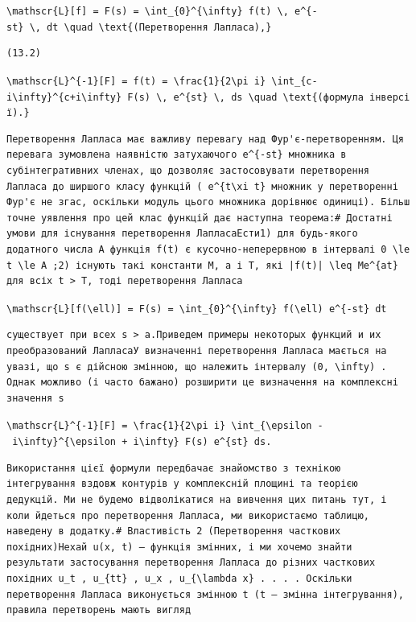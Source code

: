 \documentclass[
  ukrainian,
]{article}
\begin{document}
\texttt{\textbackslash{}mathscr\{L\}{[}f{]}\ =\ F(s)\ =\ \textbackslash{}int\_\{0\}\^{}\{\textbackslash{}infty\}\ f(t)\ \textbackslash{},\ e\^{}\{-st\}\ \textbackslash{},\ dt\ \textbackslash{}quad\ \textbackslash{}text\{(Перетворення\ Лапласа),\}}

\begin{verbatim}
(13.2)
\end{verbatim}

\texttt{\textbackslash{}mathscr\{L\}\^{}\{-1\}{[}F{]}\ =\ f(t)\ =\ \textbackslash{}frac\{1\}\{2\textbackslash{}pi\ i\}\ \textbackslash{}int\_\{c-i\textbackslash{}infty\}\^{}\{c+i\textbackslash{}infty\}\ F(s)\ \textbackslash{},\ e\^{}\{st\}\ \textbackslash{},\ ds\ \textbackslash{}quad\ \textbackslash{}text\{(формула\ інверсії).\}}

\begin{verbatim}
Перетворення Лапласа має важливу перевагу над Фур'є-перетворенням. Ця перевага зумовлена наявністю затухаючого e^{-st} множника в субінтегративних членах, що дозволяє застосовувати перетворення Лапласа до ширшого класу функцій ( e^{t\xi t} множник у перетворенні Фур'є не згас, оскільки модуль цього множника дорівнює одиниці). Більш точне уявлення про цей клас функцій дає наступна теорема:# Достатні умови для існування перетворення ЛапласаЕсти1) для будь-якого додатного числа A функція f(t) є кусочно-неперервною в інтервалі 0 \le t \le A ;2) існують такі константи M, a і T, які |f(t)| \leq Me^{at} для всіх t > T, тоді перетворення Лапласа
\end{verbatim}

\texttt{\textbackslash{}mathscr\{L\}{[}f(\textbackslash{}ell){]}\ =\ F(s)\ =\ \textbackslash{}int\_\{0\}\^{}\{\textbackslash{}infty\}\ f(\textbackslash{}ell)\ e\^{}\{-st\}\ dt}

\begin{verbatim}
существует при всех s > a.Приведем примеры некоторых функций и их преобразований ЛапласаУ визначенні перетворення Лапласа мається на увазі, що s є дійсною змінною, що належить інтервалу (0, \infty) . Однак можливо (і часто бажано) розширити це визначення на комплексні значення s
\end{verbatim}

\texttt{\textbackslash{}mathscr\{L\}\^{}\{-1\}{[}F{]}\ =\ \textbackslash{}frac\{1\}\{2\textbackslash{}pi\ i\}\ \textbackslash{}int\_\{\textbackslash{}epsilon\ -\ i\textbackslash{}infty\}\^{}\{\textbackslash{}epsilon\ +\ i\textbackslash{}infty\}\ F(s)\ e\^{}\{st\}\ ds.}

\begin{verbatim}
Використання цієї формули передбачає знайомство з технікою інтегрування вздовж контурів у комплексній площині та теорією дедукцій. Ми не будемо відволікатися на вивчення цих питань тут, і коли йдеться про перетворення Лапласа, ми використаємо таблицю, наведену в додатку.# Властивість 2 (Перетворення часткових похідних)Нехай u(x, t) — функція змінних, і ми хочемо знайти результати застосування перетворення Лапласа до різних часткових похідних u_t , u_{tt} , u_x , u_{\lambda x} . . . . Оскільки перетворення Лапласа виконується змінною t (t — змінна інтегрування), правила перетворень мають вигляд
\end{verbatim}
\end{document}
